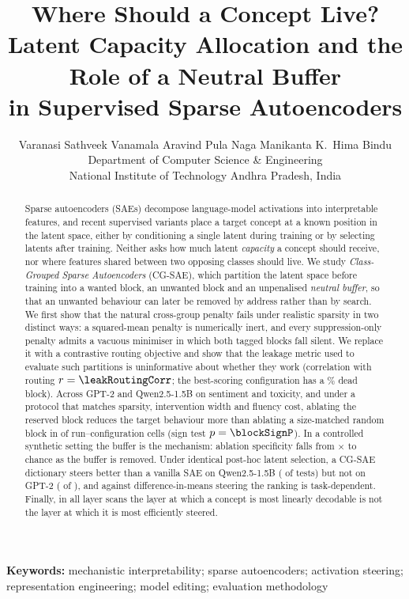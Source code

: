 \documentclass[11pt,a4paper]{article}
\title{\vspace{-1.2em}\textbf{Where Should a Concept Live?\\[2pt]
\large Latent Capacity Allocation and the Role of a Neutral Buffer\\ in Supervised Sparse Autoencoders}}
\author{Varanasi Sathveek \qquad Vanamala Aravind \qquad Pula Naga Manikanta \qquad K.\ Hima Bindu\\[4pt]
\normalsize Department of Computer Science \& Engineering\\
\normalsize National Institute of Technology Andhra Pradesh, India}
\date{}
\theoremstyle{remark}
\begin{document}
\maketitle

\begin{abstract}
\noindent
Sparse autoencoders (SAEs) decompose language-model activations into interpretable
features, and recent supervised variants place a target concept at a known position in the
latent space, either by conditioning a single latent during training or by selecting latents
after training. Neither asks how much latent \emph{capacity} a concept should receive, nor
where features shared between two opposing classes should live. We study
\emph{Class-Grouped Sparse Autoencoders} (CG-SAE), which partition the latent space before
training into a wanted block, an unwanted block and an unpenalised \emph{neutral buffer}, so
that an unwanted behaviour can later be removed by address rather than by search. We first
show that the natural cross-group penalty fails under realistic sparsity in two distinct ways:
a squared-mean penalty is numerically inert, and every suppression-only penalty admits a
vacuous minimiser in which both tagged blocks fall silent. We replace it with a contrastive
routing objective and show that the leakage metric used to evaluate such partitions is
uninformative about whether they work (correlation with routing $r=\leakRoutingCorr$; the
best-scoring configuration has a \bestLeakDeadPct\% dead block). Across GPT-2 and
Qwen2.5-1.5B on sentiment and toxicity, and under a protocol that matches sparsity,
intervention width and fluency cost, ablating the reserved block reduces the target behaviour
more than ablating a size-matched random block in \blockPositive{} of \blockTotal{}
run--configuration cells (sign test $p=\blockSignP$). In a controlled synthetic setting the
buffer is the mechanism: ablation specificity falls from \specMax$\times$ to chance as the
buffer is removed. Under identical post-hoc latent selection, a CG-SAE dictionary steers better
than a vanilla SAE on Qwen2.5-1.5B (\vsSSVqwenSig{} of \vsSSVqwenTotal{} tests) but not on GPT-2
(\vsSSVgptSig{} of \vsSSVgptTotal{}), and against difference-in-means steering the ranking
is task-dependent. Finally, in all \layerScans{} layer scans the layer at which a concept is
most linearly decodable is not the layer at which it is most efficiently steered.
\end{abstract}

\noindent\textbf{Keywords:} mechanistic interpretability; sparse autoencoders; activation
steering; representation engineering; model editing; evaluation methodology
\end{document}
